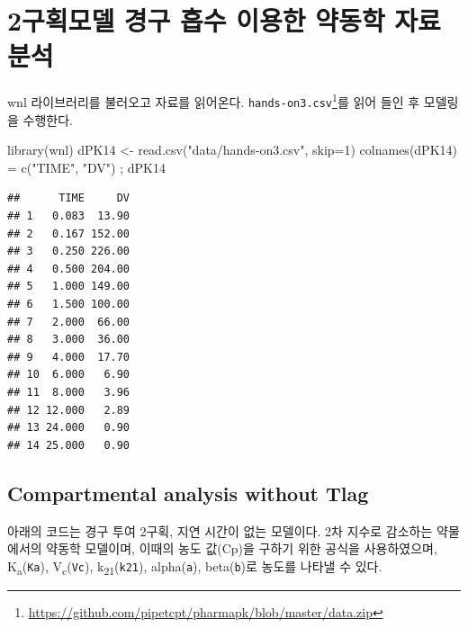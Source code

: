 \documentclass[
  11pt,
  krantz2, a4paper, twoside]{krantz}
\newenvironment{Shaded}{\begin{snugshade}}{\end{snugshade}}
\newcommand{\AttributeTok}[1]{\textcolor[rgb]{0.77,0.63,0.00}{#1}}
\newcommand{\DecValTok}[1]{\textcolor[rgb]{0.00,0.00,0.81}{#1}}
\newcommand{\FunctionTok}[1]{\textcolor[rgb]{0.00,0.00,0.00}{#1}}
\newcommand{\NormalTok}[1]{#1}
\newcommand{\OtherTok}[1]{\textcolor[rgb]{0.56,0.35,0.01}{#1}}
\newcommand{\StringTok}[1]{\textcolor[rgb]{0.31,0.60,0.02}{#1}}
\theoremstyle{definition}
\theoremstyle{definition}
\theoremstyle{definition}
\theoremstyle{definition}
\theoremstyle{remark}
\begin{document}
\hypertarget{uxad6cuxd68duxbaa8uxb378-uxacbduxad6c-uxd761uxc218-uxc774uxc6a9uxd55c-uxc57duxb3d9uxd559-uxc790uxb8cc-uxbd84uxc11d}{%
\section{\texorpdfstring{2구획모델 경구 흡수 이용한 약동학 자료 분석}{2구획모델 경구 흡수 이용한 약동학 자료 분석}}\label{uxad6cuxd68duxbaa8uxb378-uxacbduxad6c-uxd761uxc218-uxc774uxc6a9uxd55c-uxc57duxb3d9uxd559-uxc790uxb8cc-uxbd84uxc11d}}

wnl 라이브러리를 불러오고 자료를 읽어온다.
\texttt{hands-on3.csv}\footnote{\url{https://github.com/pipetcpt/pharmapk/blob/master/data.zip}}를 읽어 들인 후 모델링을 수행한다.

\begin{Shaded}
\begin{Highlighting}[]
\FunctionTok{library}\NormalTok{(wnl)}
\NormalTok{dPK14 }\OtherTok{\textless{}{-}} \FunctionTok{read.csv}\NormalTok{(}\StringTok{"data/hands{-}on3.csv"}\NormalTok{, }\AttributeTok{skip=}\DecValTok{1}\NormalTok{)}
\FunctionTok{colnames}\NormalTok{(dPK14) }\OtherTok{=} \FunctionTok{c}\NormalTok{(}\StringTok{"TIME"}\NormalTok{, }\StringTok{"DV"}\NormalTok{) ; dPK14}
\end{Highlighting}
\end{Shaded}

\begin{verbatim}
##      TIME     DV
## 1   0.083  13.90
## 2   0.167 152.00
## 3   0.250 226.00
## 4   0.500 204.00
## 5   1.000 149.00
## 6   1.500 100.00
## 7   2.000  66.00
## 8   3.000  36.00
## 9   4.000  17.70
## 10  6.000   6.90
## 11  8.000   3.96
## 12 12.000   2.89
## 13 24.000   0.90
## 14 25.000   0.90
\end{verbatim}

\hypertarget{compartmental-analysis-without-tlag-1}{%
\subsection{Compartmental analysis without Tlag}\label{compartmental-analysis-without-tlag-1}}

아래의 코드는 경구 투여 2구획, 지연 시간이 없는 모델이다. 
2차 지수로 감소하는 약물에서의 약동학 모델이며, 이때의 농도 값(Cp)을 구하기 위한 공식을 사용하였으며, K\textsubscript{a}(\texttt{Ka}), V\textsubscript{c}(\texttt{Vc}), k\textsubscript{21}(\texttt{k21}), alpha(\texttt{a}), beta(\texttt{b})로 농도를 나타낼 수 있다.
\end{document}
